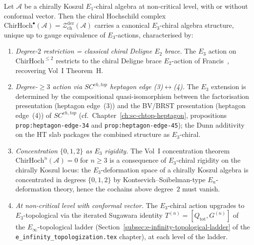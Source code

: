 \documentclass[11pt]{article}
\begin{document}
\begin{theorem}
\label{thm:theoremH-chiral-higher-deligne}
Let $\mathcal{A}$ be a chirally Koszul $E_1$-chiral algebra at
non-critical level, with or without conformal vector. Then the
chiral Hochschild complex
$\mathrm{ChirHoch}^\bullet(\mathcal{A}) = \mathcal{Z}^{\mathrm{der}}_{\mathrm{ch}}(\mathcal{A})$
carries a canonical $E_3$-chiral algebra structure, unique up to
gauge equivalence of $E_3$-actions, characterised by:
\begin{enumerate}
\item\label{thH-i} \emph{Degree-$2$ restriction = classical chiral
  Deligne $E_2$ brace.} The $E_3$ action on
  $\mathrm{ChirHoch}^{\le 2}$ restricts to the chiral Deligne brace
  $E_2$-action of Francis~\cite{Francis2012},
  recovering Vol~I Theorem~H.
\item\label{thH-ii} \emph{Degree-$\ge 3$ action via $SC^{ch,top}$
  heptagon edge (3)$\leftrightarrow$(4).} The $E_3$ extension is
  determined by the compositional quasi-isomorphism between the
  factorisation presentation (heptagon edge~(3)) and the BV/BRST
  presentation (heptagon edge~(4)) of $SC^{ch,top}$ (cf.\
  Chapter~\ref{ch:sc-chtop-heptagon}, propositions
  \texttt{prop:heptagon-edge-34} and
  \texttt{prop:heptagon-edge-45}); the Dunn additivity on the HT
  slab packages the combined structure as $E_3$-chiral.
\item\label{thH-iii} \emph{Concentration $\{0, 1, 2\}$ as $E_3$
  rigidity.} The Vol~I concentration theorem
  $\mathrm{ChirHoch}^n(\mathcal{A}) = 0$ for $n \ge 3$ is a
  consequence of $E_3$-chiral rigidity on the chirally Koszul
  locus: the $E_3$-deformation space of a chirally Koszul
  algebra is concentrated in degrees $\{0, 1, 2\}$ by
  Kontsevich--Soibelman-type $E_n$-deformation theory, hence the
  cochains above degree~$2$ must vanish.
\item\label{thH-iv} \emph{At non-critical level with conformal
  vector.} The $E_3$-chiral action upgrades to $E_3$-topological
  via the iterated Sugawara identity
  $T^{(n)} = [Q_{\mathrm{tot}}, G^{(n)}]$ of
  the $E_\infty$-topological ladder
  (Section~\ref{subsec:e-infinity-topological-ladder}
  of the \texttt{e\_infinity\_topologization.tex} chapter), at
  each level of the ladder.
\end{enumerate}
\end{theorem}
\end{document}
